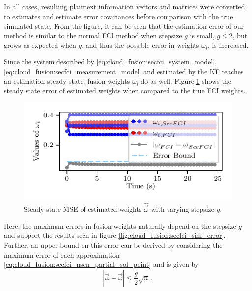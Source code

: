  In all cases, resulting plaintext information vectors and matrices were converted to estimates and estimate error covariances before comparison with the true simulated state. From the figure, it can be seen that the estimation error of our method is similar to the normal FCI method when stepsize $g$ is small, $g\leq 2$, but grows as expected when $g$, and thus the possible error in weights $\omega_i$, is increased.

Since the system described by \eqref{eq:cloud_fusion:secfci_system_model}, \eqref{eq:cloud_fusion:secfci_measurement_model} and estimated by the KF reaches an estimation steady-state, fusion weights $\omega_i$ do as well. Figure \ref{fig:cloud_fusion:secfci_omega_error} shows the steady state error of estimated weights when compared to the true FCI weights. 
\begin{figure}[htbp]
    \centering
    \includegraphics{figures/omegas_cmp.pdf}
    \caption{Steady-state MSE of estimated weights $\hat{\vec{\omega}}$ with varying stepsize $g$.}
    \label{fig:cloud_fusion:secfci_omega_error}
\end{figure}
Here, the maximum errors in fusion weights naturally depend on the stepsize $g$ and support the results seen in figure \ref{fig:cloud_fusion:secfci_sim_error}. Further, an upper bound on this error can be derived by considering the maximum error of each approximation \eqref{eq:cloud_fusion:secfci_nsen_partial_sol_point} and is given by
\begin{equation}
    \left|\hat{\vec{\omega}} - \vec{\omega}\right| \leq \frac{g}{2}\sqrt{n}\,.
\end{equation}

